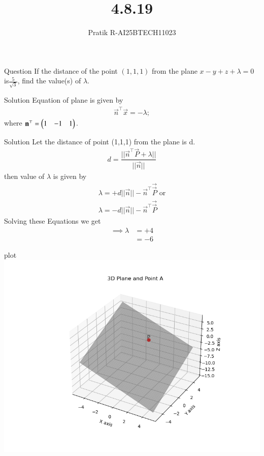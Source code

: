 \documentclass{beamer}
\title 
{4.8.19}
\author 
{Pratik R-AI25BTECH11023}
\begin{document}
\frame{\titlepage}
\begin{frame}{Question}
If the distance of the point $(1,1,1)$ from the plane $x-y+z+ \lambda = 0$ is$\frac{5}{\sqrt{3}}$, find the value(s) of $\lambda$.
\end{frame}
\begin{frame}{Solution} 
Equation of plane is given by
\begin{align}
	\vec{n}^\top \vec{x} = -\lambda;
\end{align}
	where $\mathbf{n}^\top = \begin{pmatrix}1&-1&1\end{pmatrix}$. 
\end{frame}
\begin{frame}{Solution}
	Let the distance of point (1,1,1) from the plane is d.
\begin{align}
	d = \dfrac{||\vec{n}^\top \vec{P} + \lambda||}{||\vec{n}||}
\end{align}
then value of $\lambda $ is given by
\begin{align}
	\lambda = + d||\vec{n}||-\vec{n}^\top \vec{\vec{P}} \text{ or} \\
	\lambda = - d||\vec{n}||-\vec{n}^\top \vec{\vec{P}}
\end{align}
Solving these Equations we get
\begin{align}
   \implies \lambda &= +4 \\
    &=-6
\end{align}
\end{frame}
\begin{frame}{plot}
\centering
    \includegraphics[width=\columnwidth, height=0.8\textheight, keepaspectratio]{../figs/fig1.png}     
\end{frame}
\end{document}
